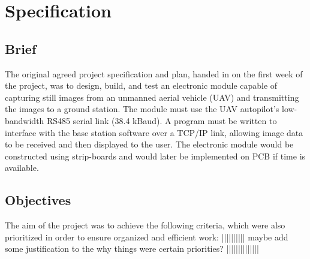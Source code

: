 \chapter{Specification}
\label{chap:specification}
\section{Brief}
The original agreed project specification and plan, handed in on the first week of the project, was to design, build, and test an electronic module capable of capturing still images from an unmanned aerial vehicle (UAV) and transmitting the images to a ground station. The module must use the UAV autopilot’s low-bandwidth RS485 serial link (38.4 kBaud). A program must be written to interface with the base station software over a TCP/IP link, allowing image data to be received and then displayed to the user. The electronic module would be constructed using strip-boards and would later be implemented on PCB if time is available.


\section{Objectives} 
The aim of the project was to achieve the following criteria, which were also prioritized in order to ensure organized and efficient work: 
|||||||||| maybe add some justification to the why things were certain priorities? ||||||||||||||


